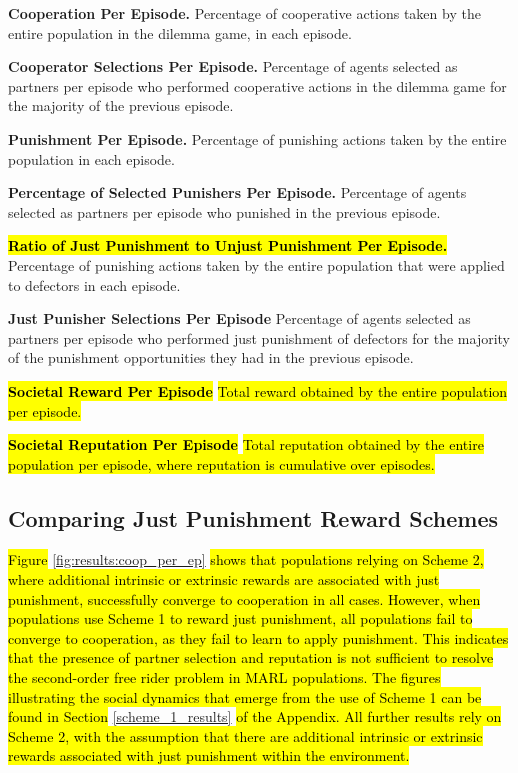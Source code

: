 \documentclass[sn-aps,numbered]{sn-jnl}%
\theoremstyle{thmstyleone}%
\theoremstyle{thmstyletwo}%
\theoremstyle{thmstylethree}%
\begin{document}
\noindent \textbf{Cooperation Per Episode.} Percentage of cooperative actions taken by the entire population in the dilemma game, in each episode. 

\noindent \textbf{Cooperator Selections Per Episode.} Percentage of agents selected as partners per episode who performed cooperative actions in the dilemma game for the majority of the previous episode.

\noindent \textbf{Punishment Per Episode.} Percentage of punishing actions taken by the entire population in each episode. 

\noindent \textbf{Percentage of Selected Punishers Per Episode.} Percentage of agents selected as partners per episode who punished in the previous episode.  

\noindent \textbf{\hl{Ratio of Just Punishment to Unjust Punishment Per Episode.}} Percentage of punishing actions taken by the entire population that were applied to defectors in each episode. 

\noindent \textbf{Just Punisher Selections Per Episode} Percentage of agents selected as partners per episode who performed just punishment of defectors for the majority of the punishment opportunities they had in the previous episode.  

\noindent \textbf{\hl{Societal Reward Per Episode}} \hl{Total reward obtained by the entire population per episode.}  

\noindent \textbf{\hl{Societal Reputation Per Episode}} \hl{Total reputation obtained by the entire population per episode, where reputation is cumulative over episodes.}

\noindent \subsection{Comparing Just Punishment Reward Schemes}

\hl{Figure} \ref{fig:results:coop_per_ep} \hl{shows that populations relying on Scheme 2, where additional intrinsic or extrinsic rewards are associated with just punishment, successfully converge to cooperation in all cases. However, when populations use Scheme 1 to reward just punishment, all populations fail to converge to cooperation, as they fail to learn to apply punishment. This indicates that the presence of partner selection and reputation is not sufficient to resolve the second-order free rider problem in MARL populations. The figures illustrating the social dynamics that emerge from the use of Scheme 1 can be found in Section} \ref{scheme_1_results} \hl{of the Appendix. All further results rely on Scheme 2, with the assumption that there are additional intrinsic or extrinsic rewards associated with just punishment within the environment.}
\end{document}
